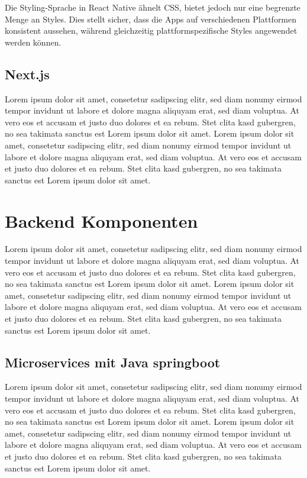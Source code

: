 Die Styling-Sprache in React Native ähnelt CSS, bietet jedoch nur eine 
begrenzte Menge an Styles. Dies stellt sicher, dass die Apps 
auf verschiedenen Plattformen konsistent aussehen, während 
gleichzeitig plattformspezifische Styles angewendet werden können.\\

\subsection{Next.js}
Lorem ipsum dolor sit amet, consetetur sadipscing
elitr, sed diam nonumy eirmod tempor invidunt ut labore
et dolore magna aliquyam erat, sed diam voluptua. At vero eos et
accusam et justo duo dolores et ea rebum. Stet clita kasd gubergren, 
no sea takimata sanctus est Lorem ipsum dolor sit amet. Lorem ipsum dolor 
sit amet, consetetur sadipscing elitr, sed diam nonumy eirmod tempor 
invidunt ut labore et dolore magna aliquyam erat, sed diam voluptua. 
At vero eos et accusam et justo duo dolores et ea rebum. Stet clita kasd 
gubergren, no sea takimata sanctus est Lorem ipsum dolor sit amet.

\section{Backend Komponenten}
Lorem ipsum dolor sit amet, consetetur sadipscing
elitr, sed diam nonumy eirmod tempor invidunt ut labore
et dolore magna aliquyam erat, sed diam voluptua. At vero eos et
accusam et justo duo dolores et ea rebum. Stet clita kasd gubergren, 
no sea takimata sanctus est Lorem ipsum dolor sit amet. Lorem ipsum dolor 
sit amet, consetetur sadipscing elitr, sed diam nonumy eirmod tempor 
invidunt ut labore et dolore magna aliquyam erat, sed diam voluptua. 
At vero eos et accusam et justo duo dolores et ea rebum. Stet clita kasd 
gubergren, no sea takimata sanctus est Lorem ipsum dolor sit amet.

\subsection{Microservices mit Java springboot}
Lorem ipsum dolor sit amet, consetetur sadipscing
elitr, sed diam nonumy eirmod tempor invidunt ut labore
et dolore magna aliquyam erat, sed diam voluptua. At vero eos et
accusam et justo duo dolores et ea rebum. Stet clita kasd gubergren, 
no sea takimata sanctus est Lorem ipsum dolor sit amet. Lorem ipsum dolor 
sit amet, consetetur sadipscing elitr, sed diam nonumy eirmod tempor 
invidunt ut labore et dolore magna aliquyam erat, sed diam voluptua. 
At vero eos et accusam et justo duo dolores et ea rebum. Stet clita kasd 
gubergren, no sea takimata sanctus est Lorem ipsum dolor sit amet.

